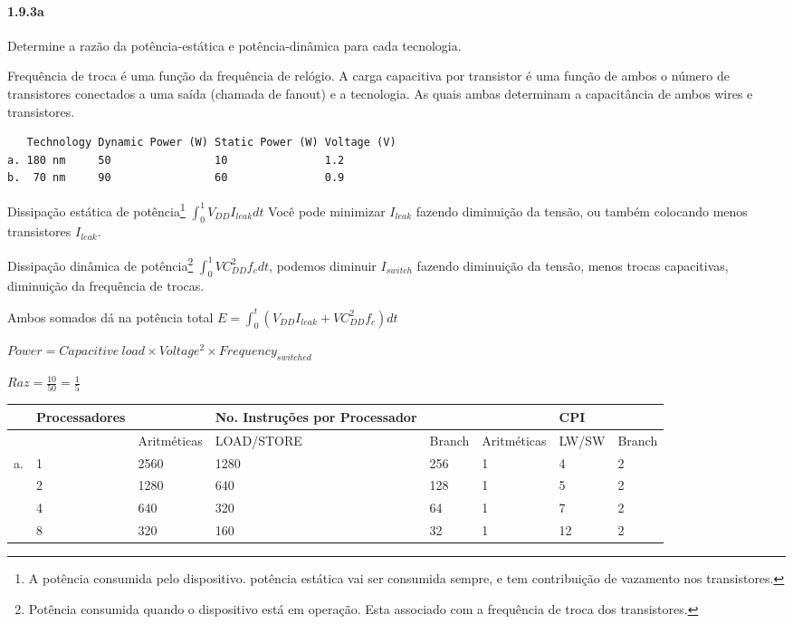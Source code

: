 \documentclass{article}
\begin{document}
\paragraph{1.9.3a} Determine a razão da potência-estática e potência-dinâmica 
para cada tecnologia.

Frequência de troca é uma função da frequência de relógio. A carga capacitiva 
por transistor é uma função de ambos o número de transistores conectados a uma 
saída (chamada de fanout) e a tecnologia. As quais ambas determinam a 
capacitância de ambos wires e transistores.

\begin{verbatim}
   Technology Dynamic Power (W) Static Power (W) Voltage (V)
a. 180 nm     50                10               1.2
b.  70 nm     90                60               0.9
\end{verbatim}

Dissipação estática de potência\footnote{A potência consumida pelo dispositivo.
potência estática vai ser consumida sempre, e tem contribuição de vazamento nos
transistores.} $\int_{0}^{1}V_{DD}I_{leak}dt$ Você pode minimizar $I_{leak}$
fazendo diminuição da tensão, ou também colocando menos transistores $I_{leak}$.

Dissipação dinâmica de potência\footnote{Potência consumida quando o dispositivo
está em operação. Esta associado com a frequência de troca dos transistores.}
$\int_{0}^{1}VC^{2}_{DD}f_{c}dt$, podemos diminuir $I_{switch}$ fazendo
diminuição da tensão, menos trocas capacitivas, diminuição da frequência de
trocas.

Ambos somados dá na potência total $E = 
\int_{0}^{t}(V_{DD}I_{leak}+VC^{2}_{DD}f_{c})dt$

$Power = Capacitive\ load \times Voltage^{2} \times Frequency_{switched}$

$Raz = \frac{10}{50} = \frac{1}{5}$

\begin{tabular}{|l|l|l|l|l|l|l|l|}
\hline  & Processadores & & No. Instruções por Processador & & & CPI & \\
\hline  & & Aritméticas &
            LOAD/STORE  &
            Branch      &
            Aritméticas &
            LW/SW       &
            Branch      \\
\hline a.& 1& 2560& 1280& 256& 1&  4& 2\\
\hline   & 2& 1280&  640& 128& 1&  5& 2\\
\hline   & 4&  640&  320&  64& 1&  7& 2\\
\hline   & 8&  320&  160&  32& 1& 12& 2\\
\hline
\end{tabular}
\end{document}
